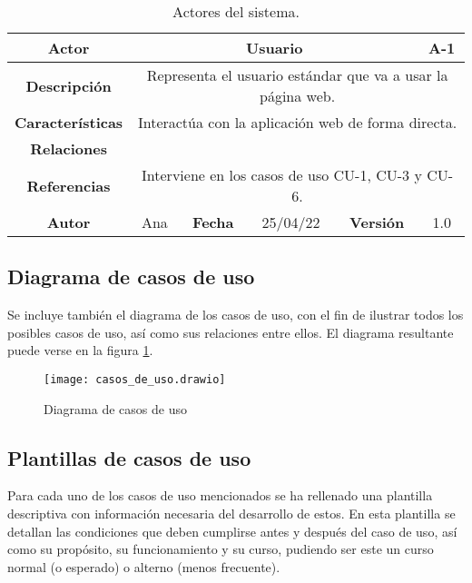 \begin{table}[!h]
\caption{Actores del sistema.}
\begin{tabular}{|c|c|c|c|c|c|c|c|}
\hline
 \rowcolor{azulillo} \textbf{Actor} & \multicolumn{6}{|c|}{Usuario} & {A-1} \\
\hline
 \cellcolor{azulillo} \textbf{Descripción}              & \multicolumn{7}{|c|}{Representa el usuario estándar que va a usar la página web.}           \\
\hline
 \cellcolor{azulillo} \textbf{Características}                 & \multicolumn{7}{|c|}{Interactúa con la aplicación web de forma directa.}             \\
\hline
 \cellcolor{azulillo} \textbf{Relaciones}         & \multicolumn{7}{|c|}{}             \\
\hline
\cellcolor{azulillo} \textbf{Referencias}        & \multicolumn{7}{|c|}{Interviene en los casos de uso CU-1, CU-3 y CU-6.}              \\
\hline
\cellcolor{azulillo} \textbf{Autor}                &   Ana  & \multicolumn{2}{|c|}{\cellcolor{azulillo} \textbf{Fecha}} &  25/04/22   & \multicolumn{2}{|c|}{\cellcolor{azulillo} \textbf{Versión}} & 1.0  \\
\hline
\end{tabular}
\label{tab: actores}
\end{table}

\subsection{Diagrama de casos de uso}

Se incluye también el diagrama de los casos de uso, con el fin de ilustrar todos los posibles casos de uso, así como sus relaciones entre ellos. El diagrama resultante puede verse en la figura \ref{diag: casos_uso}.

\begin{figure}[!h]
\begin{center}
\caption{Diagrama de casos de uso}
\label{diag: casos_uso}
\texttt{[image: casos\_de\_uso.drawio]}
\end{center}
\end{figure}




\subsection{Plantillas de casos de uso}

Para cada uno de los casos de uso mencionados se ha rellenado una plantilla descriptiva con información necesaria del desarrollo de estos. En esta plantilla se detallan las condiciones que deben cumplirse antes y después del caso de uso, así como su propósito, su funcionamiento y su curso, pudiendo ser este un curso normal (o esperado) o alterno (menos frecuente).

